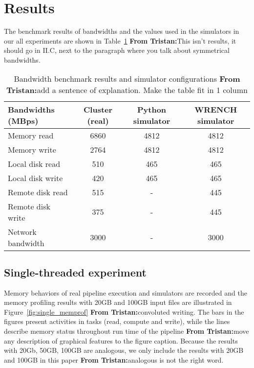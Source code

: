 \documentclass[conference]{IEEEtran}
\newcommand{\tristan}[1]{\color{orange}\textbf{From Tristan:}#1\color{black}}
\begin{document}
	\section{Results}
	\label{results}			
		The benchmark results of bandwidths and the values used in the simulators 
		in our all experiments are shown in Table~\ref{table:benchmark} \tristan{This isn't results, it should go in II.C, 
		next to the paragraph where you talk about symmetrical bandwidths}. 
		
		\begin{table}
		\centering
		\begin{tabular}{|l|c|c|c|}
		\hline
			Bandwidths (MBps)  & Cluster (real) & Python simulator & WRENCH simulator\\
		\hline
			Memory read  & 6860	& 4812	 & 4812\\
			Memory write & 2764	& 4812 & 4812\\
			Local disk read & 510 & 465 & 465\\
			Local disk write & 420 & 465	 & 465\\
			Remote disk read & 515 & - & 445\\
			Remote disk write & 375 & - & 445\\
			Network bandwidth & 3000 & - & 3000\\
		\hline
		\end{tabular}
		\caption{Bandwidth benchmark results and simulator configurations \tristan{add a sentence of explanation. Make the table fit in 1 column}}
		\label{table:benchmark}
		\end{table}		
		
		\subsection{Single-threaded experiment}

			Memory behaviors of real pipeline execution and simulators are recorded 
			and the memory profiling results with 20GB and 100GB input files 
			are illustrated in Figure~\ref{fig:single_memprof} \tristan{convoluted writing}. 
			The bars in the figures present activities in tasks (read, compute and write), 
			while the lines describe memory status throughout run time of the pipeline \tristan{move any description of graphical features to the figure caption}. 
			Because the results with 20Gb, 50GB, 100GB are analogous, we only include 
			the results with 20GB and 100GB in this paper \tristan{analogous is not the right word}. 
			
\end{document}
